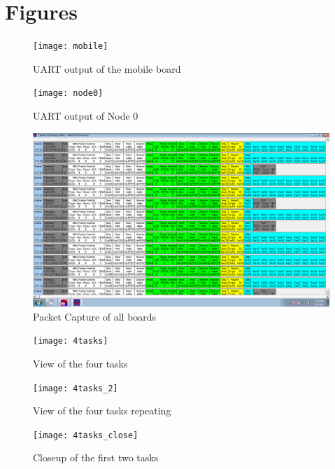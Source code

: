 \documentclass{article}
\begin{document}
\section*{Figures}
\begin{figure}[h]
  \texttt{[image: mobile]}
  \caption{UART output of the mobile board}
  \label{mobile}
\end{figure}
\begin{figure}[h]
  \texttt{[image: node0]}
  \caption{UART output of Node 0}
  \label{node0}
\end{figure}
\begin{figure}[h] 
  \includegraphics[width=1.1\textwidth]{packets}
  \caption{Packet Capture of all boards}
  \label{packets}
\end{figure}
\begin{figure}[h]
  \texttt{[image: 4tasks]}
  \caption{View of the four tasks}
  \label{4tasks}
\end{figure}
\begin{figure}[h]
  \texttt{[image: 4tasks\_2]}
  \caption{View of the four tasks repeating}
  \label{4tasks_2}
\end{figure}
\begin{figure}[h]
  \texttt{[image: 4tasks\_close]}
  \caption{Closeup of the first two tasks}
  \label{4tasks_close}
\end{figure}
\end{document}
